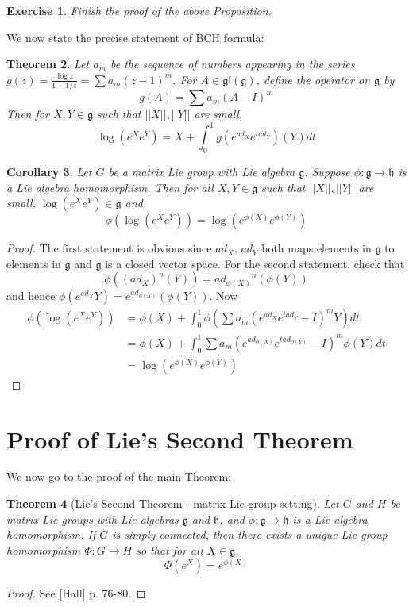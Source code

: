 \documentclass[11pt]{book}
\newtheorem{theorem}{Theorem}[section]
\newtheorem{corollary}[theorem]{Corollary}
\newtheorem{exercise}[theorem]{Exercise}
\newcommand{\mf}[1]{\mathfrak{#1}}
\begin{document}
\begin{exercise}
Finish the proof of the above Proposition.
\end{exercise}
We now state the precise statement of BCH formula:
\begin{theorem}
Let $a_m$ be the sequence of numbers appearing in the series $g(z) = \frac{\log z}{1-{1/z}} = \sum a_m (z-1)^m$. For $A \in \mf{gl}(\mf{g})$, define the operator on $\mf{g}$ by
$$g(A) = \sum a_m (A-I)^m$$
Then for $X, Y \in \mf{g}$ such that $||X||, ||Y||$ are small,
$$\log(e^Xe^Y) = X + \int_0^1 g(e^{ad_X}e^{tad_Y})(Y)dt$$
\end{theorem}
\begin{corollary}
Let $G$ be a matrix Lie group with Lie algebra $\mf{g}$. Suppose $\phi: \mf{g} \to \mf{h}$ is a Lie algebra homomorphism. Then for all $X, Y \in \mf{g}$ such that $||X||, ||Y||$ are small, $\log(e^Xe^Y) \in \mf{g}$ and
$$\phi(\log(e^Xe^Y)) = \log(e^{\phi(X)}e^{\phi(Y)})$$
\end{corollary}
\begin{proof}
The first statement is obvious since $ad_X$, $ad_Y$ both maps elements in $\mf{g}$ to elements in $\mf{g}$ and $\mf{g}$ is a closed vector space. For the second statement, check that
$$\phi((ad_X)^n(Y)) = {ad_{\phi(X)}}^n(\phi(Y))$$
and hence $\phi(e^{ad_X} Y) = e^{ad_{\phi(X)}}(\phi(Y))$. Now
\begin{align*}
\phi(
\log(e^Xe^Y)) &= \phi(X) + \int_0^1 \phi (\sum a_m (e^{ad_X}e^{tad_Y} - I)^m Y)dt\\
&= \phi(X) + \int_0^1 \sum a_m (e^{ad_{\phi(X)}}e^{t ad_{\phi(Y)}} - I)^m \phi(Y)dt\\
&= \log (e^{\phi(X)}e^{\phi(Y)})
\end{align*}
\end{proof}
\section{Proof of Lie's Second Theorem}
We now go to the proof of the main Theorem:
\begin{theorem}[Lie's Second Theorem - matrix Lie group setting] \label{algreptogprep}
Let $G$ and $H$ be matrix Lie groups with Lie algebras $\mf{g}$ and $\mf{h}$, and $\phi:\mf{g} \to \mf{h}$ is a Lie algebra homomorphism. If $G$ is simply connected, then there exists a unique Lie group homomorphism $\Phi: G \to H$ so that for all $X \in \mf{g}$,
$$\Phi(e^X) = e^{\phi(X)}$$
\end{theorem}
\begin{proof}
See [Hall] p. 76-80.
\end{proof}
\end{document}
